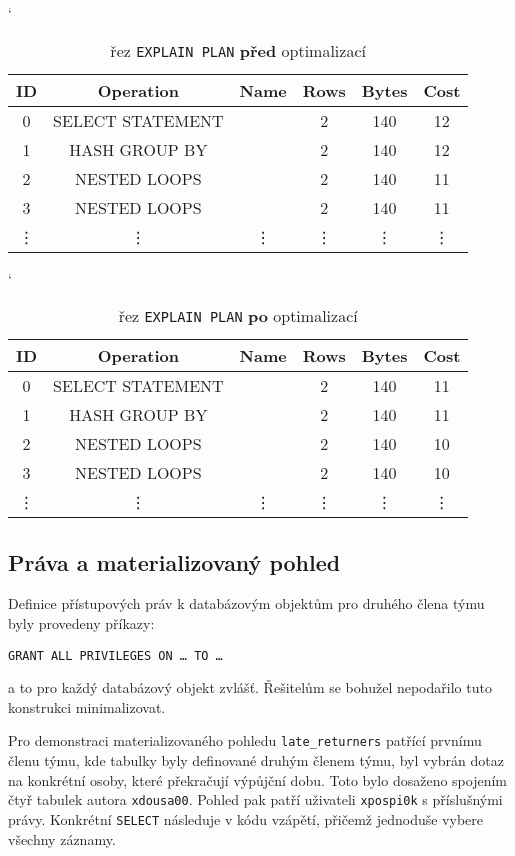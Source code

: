 \begin{table}[h]
    \centering \catcode`
    \begin{tabular}{|c|c|c|c|c|c|}
        \hline
        \textbf{ID} & \textbf{Operation} & \textbf{Name} & \textbf{Rows} & \textbf{Bytes} & \textbf{Cost} \\ \hline
        0 & SELECT STATEMENT & & 2 & 140 & {\color{red} 12} \\ 
        1 & HASH GROUP BY & & 2 & 140 & 12 \\
        2 & NESTED LOOPS & & 2 & 140 & 11 \\
        3 & NESTED LOOPS & & 2 & 140 & 11 \\ \hline
        \vdots & \vdots & \vdots & \vdots & \vdots & \vdots \\
        \hline
    \end{tabular}
    \caption{řez \texttt{EXPLAIN PLAN} \textbf{před} optimalizací}
    \label{tab3}
\end{table}

\begin{table}[h]
    \centering \catcode`
    \begin{tabular}{|c|c|c|c|c|c|}
        \hline
        \textbf{ID} & \textbf{Operation} & \textbf{Name} & \textbf{Rows} & \textbf{Bytes} & \textbf{Cost} \\ \hline
        0 & SELECT STATEMENT & & 2 & 140 & {\color{red} 11} \\ 
        1 & HASH GROUP BY & & 2 & 140 & 11 \\
        2 & NESTED LOOPS & & 2 & 140 & 10 \\
        3 & NESTED LOOPS & & 2 & 140 & 10 \\ \hline
        \vdots & \vdots & \vdots & \vdots & \vdots & \vdots \\
        \hline
    \end{tabular}
    \caption{řez \texttt{EXPLAIN PLAN} \textbf{po} optimalizací}
    \label{tab4}
\end{table}


\subsection{Práva a materializovaný pohled}
Definice přístupových práv k databázovým objektům pro druhého člena týmu byly provedeny příkazy:

\medskip
\noindent
\texttt{GRANT~ALL~PRIVILEGES~ON~\dots~TO~\dots}

\medskip
\noindent
a to pro každý databázový objekt zvlášť. Řešitelům se bohužel nepodařilo tuto konstrukci minimalizovat. 

Pro demonstraci materializovaného pohledu \texttt{late\_returners} patřící prvnímu členu týmu, kde tabulky byly definované druhým členem týmu, byl vybrán dotaz na konkrétní osoby, které překračují výpůjční dobu. Toto bylo dosaženo spojením čtyř tabulek autora \texttt{xdousa00}. Pohled pak patří uživateli \texttt{xpospi0k} s příslušnými právy. Konkrétní \texttt{SELECT} následuje v kódu vzápětí,  přičemž jednoduše vybere všechny záznamy.
